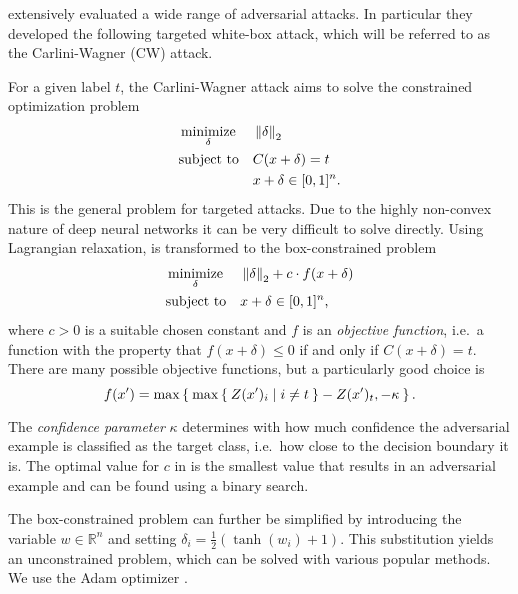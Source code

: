 \citet{carlini} extensively evaluated a wide range of adversarial attacks.
In particular they developed the following targeted white-box attack, which will be referred to as the Carlini-Wagner (CW) attack.

For a given label $t$, the Carlini-Wagner attack aims to solve the constrained optimization problem
\begin{equation}
\label{eq:generaltarget}
\begin{aligned}
& \operatorname*{minimize}_{\delta} && \left \lVert \delta \right \rVert _{2} \\
& \text{subject to} && C(x + \delta) = t \\
& && x + \delta \in [0,1]^n
\text{.}
\end{aligned}
\end{equation}
This is the general problem for targeted attacks.
Due to the highly non-convex nature of deep neural networks it can be very difficult to solve directly.
Using Lagrangian relaxation,  is transformed to the box-constrained problem
\begin{equation}
\label{eq:cwproblem}
\begin{aligned}
& \operatorname*{minimize}_{\delta} && \left \lVert \delta \right \rVert _{2} + c \cdot f(x + \delta)\\
& \text{subject to} && x + \delta \in [0,1]^n
\text{,}
\end{aligned}
\end{equation}
where $c > 0$ is a suitable chosen constant and $f$ is an \emph{objective function}, i.e.\ a function with the property that
$f(x + \delta) \leq 0$ if and only if $C(x + \delta) = t$.
There are many possible objective functions, but a particularly good choice is
\begin{equation}
\label{eq:cwobjective}
f(x') = \max \Set{ \max \Set{Z(x')_i | i \neq t } - Z(x')_t, -\kappa } \text{.}
\end{equation}%

The \emph{confidence parameter} $\kappa$ determines with how much confidence the adversarial example is classified as the target class, i.e.\ how close to the decision boundary it is.
The optimal value for $c$ in  is the smallest value that results in an adversarial example and can be found using a binary search.

The box-constrained problem can further be simplified by introducing the variable $w \in \mathbb{R}^n$ and setting $\delta_i = \frac{1}{2} (\tanh(w_i) + 1)$.
This substitution yields an unconstrained problem, which can be solved with various popular methods. We use the Adam optimizer \citep{adam}.

